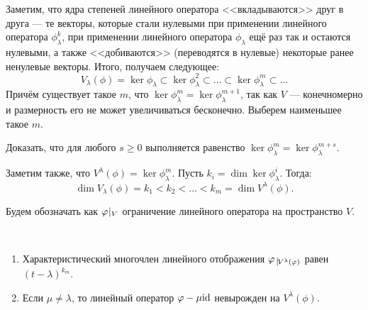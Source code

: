 \vspace{0.2cm}
Заметим, что ядра степеней линейного оператора <<вкладываются>> друг в друга --- те векторы, которые стали нулевыми при применении линейного оператора $\phi^k_\lambda$, при применении линейного оператора $\phi_\lambda$ ещё раз так и остаются нулевыми, а также <<добиваются>> (переводятся в нулевые) некоторые ранее ненулевые векторы. Итого, получаем следующее:
\[
V_\lambda(\phi) = \ker\phi_\lambda \subset \ker\phi^2_\lambda \subset \ldots \subset \ker\phi^m_\lambda 
\subset \ldots
\]
Причём существует такое $m$, что $\ker\phi^m_\lambda = \ker\phi^{m + 1}_\lambda$, так как $V$ --- конечномерно и размерность его не может увеличиваться бесконечно. Выберем наименьшее такое $m$.
\begin{Task}
	Доказать, что для любого $s \geqslant 0$ выполняется равенство $\ker\phi^m_\lambda = \ker\phi^{m + s}_\lambda.$
\end{Task}
Заметим также, что $V^{\lambda}(\phi) = \ker\phi^m_\lambda.$ Пусть $k_i = \dim\ker\phi^i_\lambda$.
Тогда:
 $$ \dim{V_{\lambda}(\phi)} = k_1 < k_2 < \ldots < k_m =  \dim{V^{\lambda}(\phi)}.
 $$
 
 Будем обозначать как ${\varphi}\negmedspace\mid_{V}$ ограничение линейного оператора на пространство $V$.
 
\begin{Suggestion}\
	\begin{enumerate}
		\item Характеристический многочлен линейного отображения $\phi \; \vline_{V^{\lambda}(\phi)}$ равен $(t - \lambda)^{k_m}$.
		\item Если $\mu \neq \lambda$, то линейный оператор $\varphi - \mu \mathrm{id}$ невырожден на  $V^{\lambda}(\phi)$.
	\end{enumerate}
\end{Suggestion}

